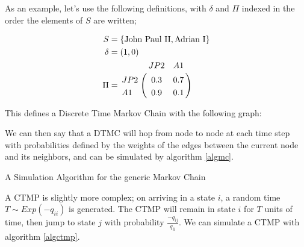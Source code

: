 As an example, let's use the following definitions, with $\delta$ and $\Pi$ indexed in the order the elements of $S$ are written;

\begin{align*}
S &= \{\mbox{John Paul II}, \mbox{Adrian I}\}\\
\delta &= \left(1,0\right)\\
\Pi &=
\bordermatrix{      & JP2&A1 \cr
                JP2 & 0.3 &  0.7 \cr
                A1  & 0.9 &  0.1 
			}
\end{align*}

This defines a Discrete Time Markov Chain with the following graph:



We can then say that a DTMC will hop from node to node at each time step with probabilities defined by the weights of the edges between the current node and its neighbors, and can be simulated by algorithm \ref{algmc}.

\begin{algorithm}
\SetAlgoLined
{}

\caption{A Simulation Algorithm for the generic Markov Chain}\label{algmc}

\end{algorithm}

A CTMP is slightly more complex; on arriving in a state $i$, a random time $T \sim Exp(-q_{ii})$ is generated. The CTMP will remain in state $i$ for $T$ units of time, then jump to state $j$ with probability $\frac{-q_{ij}}{q_{ii}}$. We can simulate a CTMP with algorithm \ref{algctmp}.

